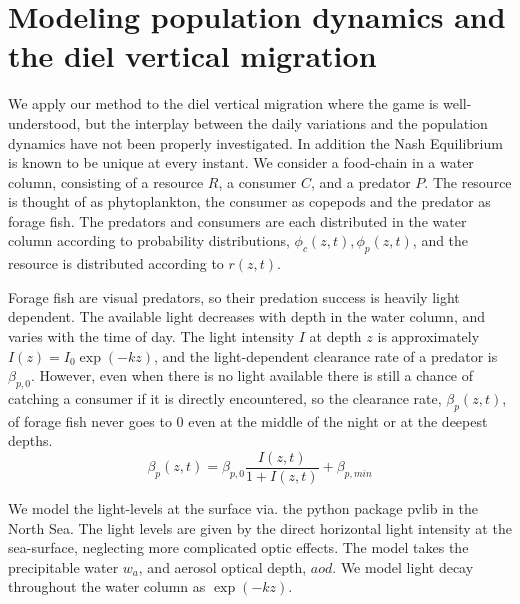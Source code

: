 
\section{Modeling population dynamics and the diel vertical migration}
We apply our method to the diel vertical migration where the game is well-understood, but the interplay between the daily variations and the population dynamics have not been properly investigated. In addition  the Nash Equilibrium is known to be unique \citep{verticalmigration} at every instant.
We consider a food-chain in a water column, consisting of a resource $R$, a consumer $C$, and a predator $P$. The resource is thought of as phytoplankton, the consumer as copepods and the predator as forage fish. The predators and consumers are each distributed in the water column according to probability distributions, $\phi_c(z,t),\phi_p(z,t)$, and the resource is distributed according to $r(z,t)$.


Forage fish are visual predators, so their predation success is heavily light dependent. The available light decreases with depth in the water column, and varies with the time of day.
The light intensity $I$ at depth $z$ is approximately $I(z) = I_0\exp(-kz)$, and the light-dependent clearance rate of a predator is $\beta_{p,0}$.  However, even when there is no light available there is still a chance of catching a consumer if it is directly encountered,  so the clearance rate, $\beta_p(z,t)$, of forage fish never goes to 0 even at the middle of the night or at the deepest depths.
\begin{equation*}
  \beta_p(z,t) = \beta_{p,0} \frac{I(z,t)}{1+I(z,t)} + \beta_{p,min}
\end{equation*}


We model the light-levels at the surface via. the python package pvlib \citep{holmgren2018pvlib} in the North Sea. The light levels are given by the direct horizontal light intensity at the sea-surface, neglecting more complicated optic effects. The model takes the precipitable water $w_a$, and aerosol optical depth, $aod$. We model light decay throughout the water column as $\exp(-kz)$.


